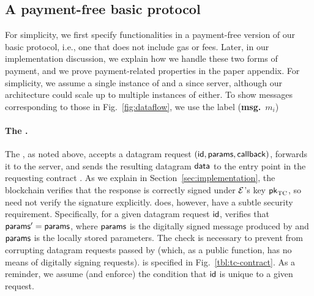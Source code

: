 \subsection{A payment-free basic protocol}
For simplicity, we first specify functionalities in a payment-free version of our basic protocol, i.e., one that does not include gas or fees. Later, in our implementation discussion, we explain how we handle these two forms of payment, and we prove payment-related properties in the paper appendix. For simplicity, we assume a single instance of \engine and a since \tc server, although our architecture could scale up to multiple instances of either. To show messages corresponding to those in Fig.~\ref{fig:dataflow}, we use the label ({\bf msg.}~$m_i$)

\paragraph{The \tcontract \tcont.} The \tcontract, as noted above, accepts a datagram request $({\sf id}, {\sf params}, {\sf callback})$, forwards it to the \tc server, and sends the resulting datagram ${\sf data}$ to the entry point \dgcallback in the requesting contract \reqcont. As we explain in Section~\ref{sec:implementation}, the blockchain verifies that the response is correctly signed under $\mathcal{E}$'s key ${\sf pk}_{\textrm{TC}}$, so \tcont need not verify the signature explicitly. \tc does, however, have a subtle security requirement. Specifically,  for a given datagram request ${\sf id}$, \tcont verifies that ${\sf params}' = {\sf params}$, where ${\sf params}$ is the digitally signed message produced by \engine and ${\sf params}$ is the locally stored parameters. The check is necessary to prevent \relay from corrupting datagram requests passed by \tcont (which, as a public function, has no means of digitally signing requests). \tcont is specified in Fig.~\ref{tbl:tc-contract}. As a reminder, we assume (and enforce) the condition that ${\sf id}$ is unique to a given request.

